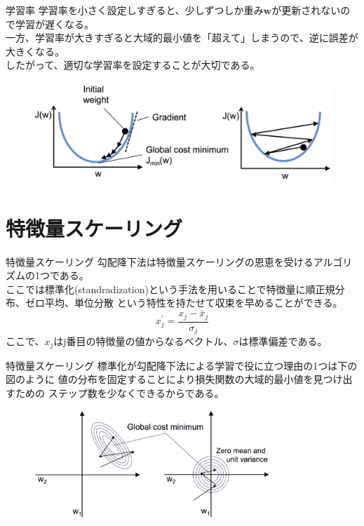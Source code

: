 \documentclass[aspectratio=169, dvipdfmx, 11pt]{beamer} %
\begin{document}
\begin{frame}{学習率}
    学習率を小さく設定しすぎると、少しずつしか重み\(\bm{w}\)が更新されないので学習が遅くなる。 \\
    一方、学習率が大きすぎると大域的最小値を「超えて」しまうので、逆に誤差が大きくなる。\\
    したがって、適切な学習率を設定することが大切である。
    \begin{figure}[b]
        \begin{center}
        \includegraphics[width=120mm]{img/day01/fig10.png}
        \end{center}
    \end{figure}
\end{frame}

\section{特徴量スケーリング}
\begin{frame}{特徴量スケーリング}
    勾配降下法は特徴量スケーリングの恩恵を受けるアルゴリズムの1つである。 \\
    ここでは標準化(standradization)という手法を用いることで特徴量に順正規分布、ゼロ平均、単位分散
    という特性を持たせて収束を早めることができる。
    \vspace{1em}
    \begin{equation*}
        x_{j}^{'} = \frac{x_j - \bar{x} _j}{\sigma_j}
    \end{equation*}
    \vspace{1em}
    ここで、\(x_j\)はj番目の特徴量の値からなるベクトル、\(\sigma\)は標準偏差である。
\end{frame}

\begin{frame}{特徴量スケーリング}
    標準化が勾配降下法による学習で役に立つ理由の1つは下の図のように
    値の分布を固定することにより損失関数の大域的最小値を見つけ出すための
    ステップ数を少なくできるからである。
    \begin{figure}[b]
        \begin{center}
        \includegraphics[width=90mm]{img/day01/fig11.png}
        \end{center}
    \end{figure}
\end{frame}
\end{document}
